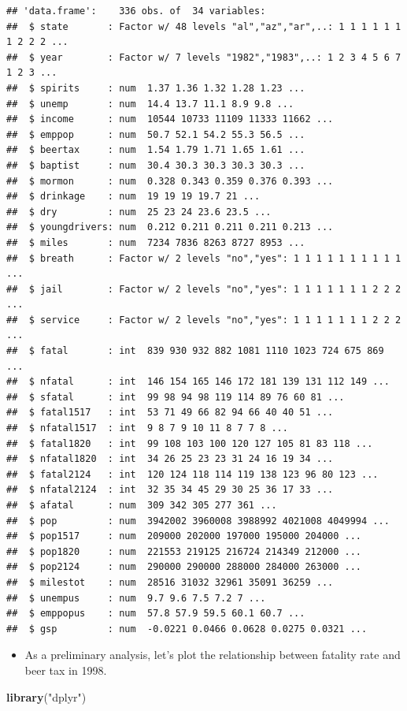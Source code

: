 \documentclass[]{book}
\newenvironment{Shaded}{\begin{snugshade}}{\end{snugshade}}
\newcommand{\KeywordTok}[1]{\textcolor[rgb]{0.13,0.29,0.53}{\textbf{#1}}}
\newcommand{\StringTok}[1]{\textcolor[rgb]{0.31,0.60,0.02}{#1}}
\newcommand{\NormalTok}[1]{#1}
\providecommand{\tightlist}{%
  \setlength{\itemsep}{0pt}\setlength{\parskip}{0pt}}
\begin{document}
\begin{verbatim}
## 'data.frame':    336 obs. of  34 variables:
##  $ state       : Factor w/ 48 levels "al","az","ar",..: 1 1 1 1 1 1 1 2 2 2 ...
##  $ year        : Factor w/ 7 levels "1982","1983",..: 1 2 3 4 5 6 7 1 2 3 ...
##  $ spirits     : num  1.37 1.36 1.32 1.28 1.23 ...
##  $ unemp       : num  14.4 13.7 11.1 8.9 9.8 ...
##  $ income      : num  10544 10733 11109 11333 11662 ...
##  $ emppop      : num  50.7 52.1 54.2 55.3 56.5 ...
##  $ beertax     : num  1.54 1.79 1.71 1.65 1.61 ...
##  $ baptist     : num  30.4 30.3 30.3 30.3 30.3 ...
##  $ mormon      : num  0.328 0.343 0.359 0.376 0.393 ...
##  $ drinkage    : num  19 19 19 19.7 21 ...
##  $ dry         : num  25 23 24 23.6 23.5 ...
##  $ youngdrivers: num  0.212 0.211 0.211 0.211 0.213 ...
##  $ miles       : num  7234 7836 8263 8727 8953 ...
##  $ breath      : Factor w/ 2 levels "no","yes": 1 1 1 1 1 1 1 1 1 1 ...
##  $ jail        : Factor w/ 2 levels "no","yes": 1 1 1 1 1 1 1 2 2 2 ...
##  $ service     : Factor w/ 2 levels "no","yes": 1 1 1 1 1 1 1 2 2 2 ...
##  $ fatal       : int  839 930 932 882 1081 1110 1023 724 675 869 ...
##  $ nfatal      : int  146 154 165 146 172 181 139 131 112 149 ...
##  $ sfatal      : int  99 98 94 98 119 114 89 76 60 81 ...
##  $ fatal1517   : int  53 71 49 66 82 94 66 40 40 51 ...
##  $ nfatal1517  : int  9 8 7 9 10 11 8 7 7 8 ...
##  $ fatal1820   : int  99 108 103 100 120 127 105 81 83 118 ...
##  $ nfatal1820  : int  34 26 25 23 23 31 24 16 19 34 ...
##  $ fatal2124   : int  120 124 118 114 119 138 123 96 80 123 ...
##  $ nfatal2124  : int  32 35 34 45 29 30 25 36 17 33 ...
##  $ afatal      : num  309 342 305 277 361 ...
##  $ pop         : num  3942002 3960008 3988992 4021008 4049994 ...
##  $ pop1517     : num  209000 202000 197000 195000 204000 ...
##  $ pop1820     : num  221553 219125 216724 214349 212000 ...
##  $ pop2124     : num  290000 290000 288000 284000 263000 ...
##  $ milestot    : num  28516 31032 32961 35091 36259 ...
##  $ unempus     : num  9.7 9.6 7.5 7.2 7 ...
##  $ emppopus    : num  57.8 57.9 59.5 60.1 60.7 ...
##  $ gsp         : num  -0.0221 0.0466 0.0628 0.0275 0.0321 ...
\end{verbatim}

\begin{itemize}
\tightlist
\item
  As a preliminary analysis, let's plot the relationship between
  fatality rate and beer tax in 1998.
\end{itemize}

\begin{Shaded}
\begin{Highlighting}[]
\KeywordTok{library}\NormalTok{(}\StringTok{"dplyr"}\NormalTok{)}
\end{Highlighting}
\end{Shaded}
\end{document}
